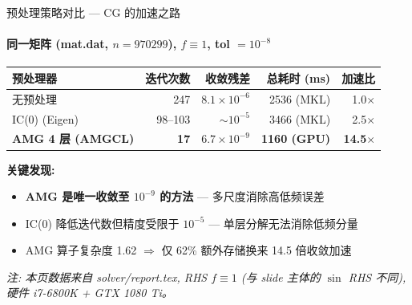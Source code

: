 \documentclass[12pt,aspectratio=169]{beamer}
\begin{document}
\begin{frame}[shrink]{预处理策略对比 — CG 的加速之路}
\framesubtitle{同一矩阵 (mat.dat, $n=970299$), $f \equiv 1$, tol $=10^{-8}$}

\footnotesize
\begin{center}
\renewcommand{\arraystretch}{1.2}
\setlength{\tabcolsep}{5pt}
\begin{tabular}{@{}l r r r r@{}}
\toprule
\textbf{预处理器} & \textbf{迭代次数} & \textbf{收敛残差} & \textbf{总耗时 (ms)} & \textbf{加速比} \\
\midrule
无预处理              & 247        & $8.1\times10^{-6}$ & 2536 (MKL)   & 1.0$\times$ \\
IC(0) (Eigen)        & 98--103    & $\sim 10^{-5}$     & 3466 (MKL)   & 2.5$\times$ \\
\textbf{AMG 4 层 (AMGCL)} & \textbf{17} & \textbf{$6.7\times10^{-9}$} & \textbf{1160 (GPU)} & \textbf{14.5$\times$} \\
\bottomrule
\end{tabular}
\end{center}
\normalsize

\vspace{4pt}
\small
\textbf{关键发现:}
\begin{itemize}\itemsep0pt
  \item \textbf{AMG 是唯一收敛至 $10^{-9}$ 的方法} — 多尺度消除高低频误差
  \item IC(0) 降低迭代数但精度受限于 $10^{-5}$ — 单层分解无法消除低频分量
  \item AMG 算子复杂度 1.62 $\Rightarrow$ 仅 62\% 额外存储换来 14.5 倍收敛加速
\end{itemize}

\vspace{2pt}
\footnotesize
\emph{注: 本页数据来自 solver/report.tex, RHS $f\equiv1$ (与 slide 主体的 $\sin$ RHS 不同), 硬件 i7-6800K + GTX 1080 Ti。}
\end{frame}
\end{document}
